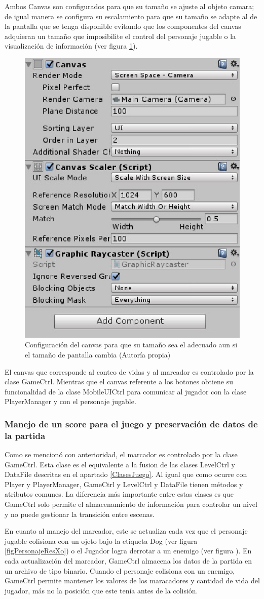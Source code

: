 Ambos Canvas son configurados para que su tamaño se ajuste al objeto camara; de
 igual manera se configura su escalamiento para que su tamaño se adapte al de la
  pantalla que se tenga disponible evitando que los componentes del canvas 
  adquieran un tamaño que imposibilite el control del personaje jugable o la 
  visualización de información (ver figura \ref{figCanvasConf}).    
 \\
 \par
 \begin{figure}
  \centering
   \includegraphics[width=0.4 \textwidth]{05TrabajoRealizado/03Unity/imagenes/02ConfiguracionCanvas}
  \caption{Configuración del canvas para que su tamaño sea el adecuado aun si el tamaño de pantalla cambia (Autoría propia)}
  \label{figCanvasConf}
\end{figure}
 El canvas que corresponde al conteo de vidas y al marcador es controlado por  
 la clase GameCtrl. Mientras que el canvas referente a los botones obtiene su  
 funcionalidad de la clase MobileUICtrl para comunicar al jugador con la clase 
 PlayerManager y con el personaje jugable.  
 
 \subsubsection{Manejo de un score para el juego y preservación de datos de la partida}
Como se mencionó con anterioridad, el marcador es controlado por la clase GameCtrl. 
Esta clase es el equivalente a la fusion de las clases LevelCtrl y DataFile 
descritas en el apartado \ref{ClasesJuego}. Al igual que como ocurre con Player 
y PlayerManager, GameCtrl y LevelCtrl y DataFile tienen métodos y atributos 
comunes. La diferencia más importante entre estas clases es que GameCtrl solo 
permite el almacenamiento de información para controlar un nivel y no puede 
gestionar la transición entre escenas. 
\\
\par
En cuanto al manejo del marcador, este se actualiza cada vez que el personaje jugable 
colisiona con un ojeto bajo la etiqueta Dog (ver figura \ref{figPersonajeResXo}) o el 
Jugador logra derrotar a un enemigo (ver figura ). En cada actualización del marcador, 
GameCtrl almacena los datos de la partida en un archivo de tipo binario. Cuando el 
personaje colisiona con un enemigo, GameCtrl permite mantener los valores de los 
maracadores y cantidad de vida del jugador, más no la posición que este tenía antes 
de la colisión.   
 
